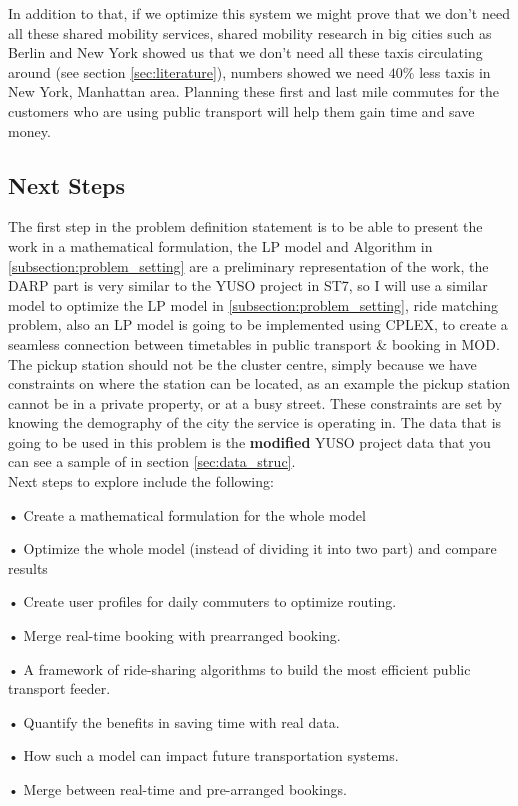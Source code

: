 \documentclass{article}
\begin{document}
In addition to that, if we optimize this system we might prove that we don\rq{t} need all these shared mobility services, shared mobility research in big cities such as Berlin and New York showed us that we don\rq{t} need all these
taxis circulating around (see section \ref{sec:literature}), numbers showed we need $40\%$ less taxis in New York, Manhattan area. Planning these first and last mile commutes for the customers who are using public transport will help them gain time and save money.


\subsection{Next Steps}
\label{subsec:next_steps}
The first step in the problem definition statement is to be able to present the work in a mathematical formulation, the LP model and Algorithm in \ref{subsection:problem_setting}  are a preliminary representation of the work, the DARP part is very similar to the YUSO project in ST7, so I will use a similar model to optimize the LP model in \ref{subsection:problem_setting}, ride matching problem, also an LP model is going to be implemented using CPLEX, to create a seamless connection between timetables in public transport \& booking in MOD. The pickup station should not be the cluster centre, simply because we have constraints on where the station can be located, as an example the pickup station cannot be in a private property, or at a busy street.
These constraints are set by knowing the demography of the city the service is operating in. The data that is going to be used in this problem is the \textbf{modified} YUSO project data that you can see a sample of in section \ref{sec:data_struc}. \\


Next steps to explore include the following:
\begin{list}{}
\item • Create a mathematical formulation for the whole model
\item • Optimize the whole model (instead of dividing it into two part) and compare results
\item • Create user profiles for daily commuters to optimize routing.
\item • Merge real-time booking with prearranged booking.
\item • A framework of ride-sharing algorithms to build the most efficient public transport feeder.
\item • Quantify the benefits in saving time with real data. 
\item •  How such a model can impact future transportation systems.
\item •  Merge between real-time and pre-arranged bookings.
\end{list}
\end{document}
